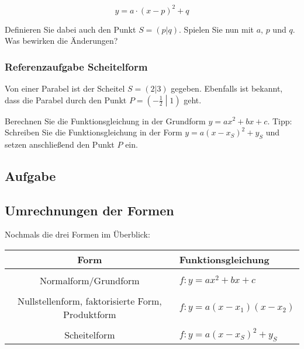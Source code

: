 $$y = a\cdot{}(x-p)^2 + q$$

Definieren Sie dabei auch den Punkt $S=(p|q)$. Spielen Sie nun mit
$a$, $p$ und $q$. Was bewirken die Änderungen?
\newpage


\subsubsection{Referenzaufgabe Scheitelform}
Von einer Parabel ist der Scheitel $S=(2|3)$ gegeben. Ebenfalls ist bekannt, dass die Parabel durch den Punkt $P=\left(-\frac{1}{2}\middle|1\right)$ geht.

  Berechnen Sie die Funktionsgleichung in der Grundform $y = ax^2 + bx + c$. Tipp:
  Schreiben Sie die Funktionsgleichung in der Form $y=a(x - x_S)^2 +  y_S$ und setzen anschließend den Punkt $P$ ein.


  \subsection*{Aufgabe}

\newpage


\subsection{Umrechnungen der Formen}

Nochmals die drei Formen im Überblick:

\begin{tabular}{c|l}
  Form & Funktionsgleichung\\
  \hline\\
  Normalform/Grundform & $f: y= ax^2 + bx + c$\\
  \hline\\
  Nullstellenform, faktorisierte Form, Produktform & $f: y=a(x-x_1)(x-x_2)$\\
  \hline\\
  Scheitelform & $f: y=a(x-x_S)^2+y_S$\\
  \hline%
\end{tabular}



